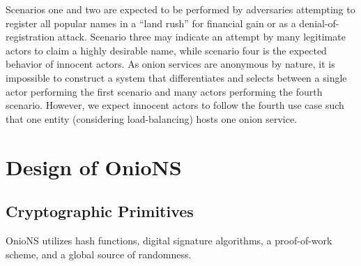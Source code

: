 \documentclass[USenglish,oneside,twocolumn]{article}
\begin{document}
Scenarios one and two are expected to be performed by adversaries attempting to register all popular names in a ``land rush'' for financial gain or as a denial-of-registration attack. Scenario three may indicate an attempt by many legitimate actors  to claim a highly desirable name, while scenario four is the expected behavior of innocent actors. As onion services are anonymous by nature, it is impossible to construct a system that differentiates and selects between a single actor performing the first scenario and many actors performing the fourth scenario. However, we expect innocent actors to follow the fourth use case such that one entity (considering load-balancing) hosts one onion service.


\vspace{-5pt}

\section{Design of OnioNS}
\label{sec:Solution}
\vspace{-5pt}
\subsection{Cryptographic Primitives}
\label{sec:cryptoPrimitives}
\vspace{-5pt}

OnioNS utilizes hash functions, digital signature algorithms, a proof-of-work scheme, and a global source of randomness.
\end{document}
